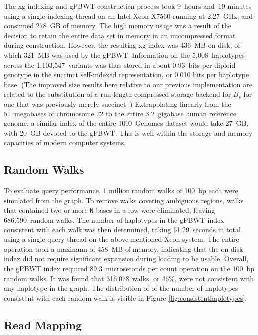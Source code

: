 The xg indexing and gPBWT construction process took 9~hours and~19 minutes using a single indexing thread on an Intel Xeon X7560 running at 2.27~GHz, and consumed 278~GB of memory. The high memory usage was a result of the decision to retain the entire data set in memory in an uncompressed format during construction. However, the resulting xg index was 436~MB on disk, of which  321~MB was used by the gPBWT. Information on the 5,008~haplotypes across the 1,103,547~variants was thus stored in about 0.93~bits per diploid genotype in the succinct self-indexed representation, or 0.010 bits per haplotype base. (The improved size results here relative to our previous implementation are related to the substitution of a run-length-compressed storage backend for $B_s$ for one that was previously merely succinct \cite{novak2016graph}.) Extrapolating linearly from the 51~megabases of chromosome 22 to the entire 3.2~gigabase human reference genome, a similar index of the entire 1000~Genomes dataset would take 27~GB, with 20~GB devoted to the gPBWT. This is well within the storage and memory capacities of modern computer systems.

\subsection{Random Walks}

To evaluate query performance, 1 million random walks of 100~bp each were simulated from the graph. To remove walks covering ambiguous regions, walks that contained two or more \texttt{N} bases in a row were eliminated, leaving 686,590~random walks. The number of haplotypes in the gPBWT index consistent with each walk was then determined, taking 61.29~seconds in total using a single query thread on the above-mentioned Xeon system. The entire operation took a maximum of 458~MB of memory, indicating that the on-disk index did not require significant expansion during loading to be usable. Overall, the gPBWT index required 89.3~microseconds per count operation on the 100~bp random walks. It was found that 316,078~walks, or 46\%, were not consistent with any haplotype in the graph. The distribution of of the number of haplotypes consistent with each random walk is visible in Figure \ref{fig:consistenthaplotypes}. 

\subsection{Read Mapping}

